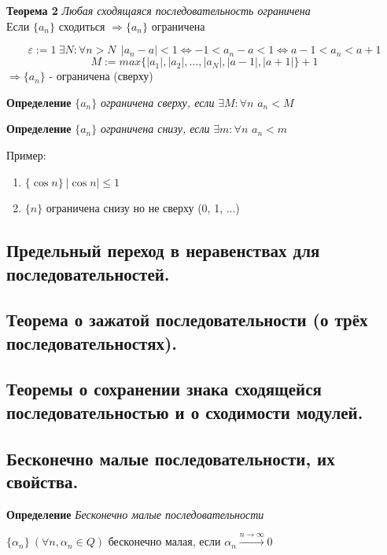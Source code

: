 \documentclass[12pt, a4paper]{article}
\newcommand{\eps}{\varepsilon}
\begin{document}
\begin{centering}
\begin{tcolorbox}
\textbf{Теорема 2} \textit{Любая сходящаяся последовательность ограничена} \\
Если $\{a_n\}$ сходиться $\Rightarrow \{a_n\}$ ограничена
\end{tcolorbox}

\begin{tcolorbox}[title=Доказательство Т2, breakable]
\[\eps := 1\ \exists N: \forall n > N\ \ |a_n-a| < 1 \Leftrightarrow -1<a_n-a<1 \Leftrightarrow a-1 < a_n < a+1  \]
\[ M:= max\{ |a_1|, |a_2|, ..., |a_N|, |a-1|, |a+1| \} + 1\]
$\Rightarrow \{a_n\}$ - ограничена (сверху)
\end{tcolorbox}

\begin{tcolorbox}
\textbf{Определение}
$\{a_n\}$  \textit{ограничена сверху, если} $\exists M: \forall n$ $a_n < M$
\end{tcolorbox}

\begin{tcolorbox}
\textbf{Определение}
$\{a_n\}$  \textit{ограничена снизу, если} $\exists m: \forall n$ $a_n < m$
\end{tcolorbox}

Пример:
\begin{enumerate}
    \item $\{\cos n\}\ |\cos n| \leq 1$
    \item $\{n\}$ ограничена снизу но не сверху (0, 1, ...)
\end{enumerate}

\subsection{Предельный переход в неравенствах для последовательностей.}
\subsection{Теорема о зажатой последовательности (о трёх последовательностях).}
\subsection{Теоремы о сохранении знака сходящейся последовательностью и о сходимости модулей.}
\subsection{Бесконечно малые последовательности, их свойства.}

\begin{tcolorbox}
\textbf{Определение}
\textit{Бесконечно малые последовательности}
\begin{center}
    $\{\alpha_n\}\ (\forall n, \alpha_n \in Q)$ бесконечно малая, если $\alpha_n 
    \xrightarrow{n\rightarrow \infty} 0$    
\end{center}
\end{tcolorbox}


\end{centering}
\end{document}
